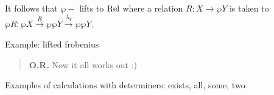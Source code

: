 It follows that $\wp-$ lifts to $\mathrm{Rel}$ where a
relation $R :  X \to \wp Y$ is taken to $\wp R : \wp X \xrightarrow{R} \wp {\wp Y}
\xrightarrow{\lambda_Y} \wp {\wp Y}$.


Example: lifted frobenius

\begin{quote}
{\bf O.R.} Now it all works out :)
\end{quote}


Examples of calculations with determiners: exists, all, some, two





%
%
%
%
%
%
%
